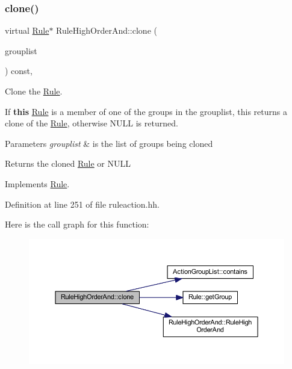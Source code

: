 \subsubsection{\texorpdfstring{clone()}{clone()}}
{\footnotesize\ttfamily virtual \mbox{\hyperlink{class_rule}{Rule}}$\ast$ Rule\+High\+Order\+And\+::clone (\begin{DoxyParamCaption}\item[{const \mbox{\hyperlink{class_action_group_list}{Action\+Group\+List}} \&}]{grouplist }\end{DoxyParamCaption}) const\hspace{0.3cm}{\ttfamily [inline]}, {\ttfamily [virtual]}}



Clone the \mbox{\hyperlink{class_rule}{Rule}}. 

If {\bfseries{this}} \mbox{\hyperlink{class_rule}{Rule}} is a member of one of the groups in the grouplist, this returns a clone of the \mbox{\hyperlink{class_rule}{Rule}}, otherwise N\+U\+LL is returned. 
\begin{DoxyParams}{Parameters}
{\em grouplist} & is the list of groups being cloned \\
\hline
\end{DoxyParams}
\begin{DoxyReturn}{Returns}
the cloned \mbox{\hyperlink{class_rule}{Rule}} or N\+U\+LL 
\end{DoxyReturn}


Implements \mbox{\hyperlink{class_rule_a70de90a76461bfa7ea0b575ce3c11e4d}{Rule}}.



Definition at line 251 of file ruleaction.\+hh.

Here is the call graph for this function\+:
\nopagebreak
\begin{figure}[H]
\begin{center}
\leavevmode
\includegraphics[width=350pt]{class_rule_high_order_and_a467fae8c3fcb0944360aa286fa7a44e9_cgraph}
\end{center}
\end{figure}
\mbox{\label{class_rule_high_order_and_ad60f9bfb0431ed033b082891756d8a12}} 

